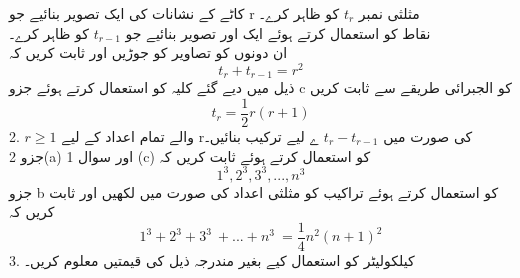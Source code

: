 کاٹے کے نشانات کی ایک تصویر بنائیے جو r مثلثی نمبر
 \(t_{r}\)
  کو ظاہر کرے۔\\
نقاط کو استعمال کرتے ہوئے ایک اور تصویر بنائیے جو
 \(t_{r-1}\)
  کو ظاہر کرے۔\\
ان دونوں کو تصاویر کو جوڑیں اور ثابت کریں کہ\\
\[ t_{r} + t_{r-1} = r^{2}\]
ذیل میں دیے گئے کلیہ کو استعمال کرتے ہوئے جزو c کو الجبرائی طریقے سے ثابت کریں\\
\[t_{r}= \frac{1}{2}r(r+ 1)\]
2.
\(r\ge1\)
والے تمام اعداد کے لیے rکی صورت میں 
\(t_{r}-t_{r-1}\)
ے لیے ترکیب بنائیں۔\\
جزو 
2(a)
اور سوال 1 
(c)
کو استعمال کرتے ہوئے ثابت کریں کہ\\

\[ 1^{3} , 2^{3} , 3^{3} , ... , n^{3}\]
جزو b کو استعمال کرتے ہوئے تراکیب کو مثلثی اعداد کی صورت میں لکھیں اور ثابت کریں کہ\\
\[ 1^{3} + 2^{3} + 3^{3}\ + ... + n^{3}\ = \frac{1}{4}n^{2}(n + 1)^{2} \]
3.
کیلکولیٹر کو استعمال کیے بغیر مندرجہ ذیل کی قیمتیں معلوم کریں۔\\

